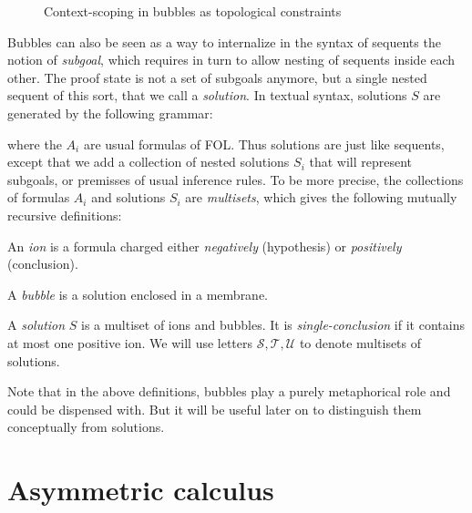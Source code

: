 \begin{figure}
  \caption{Context-scoping in bubbles as topological constraints}
\end{figure}

Bubbles can also be seen as a way to internalize in the syntax of sequents the
notion of \emph{subgoal}, which requires in turn to allow nesting of sequents
inside each other. The proof state is not a set of subgoals anymore, but a
single nested sequent of this sort, that we call a \emph{solution}. In textual syntax, solutions $S$ are generated by the
following grammar:
where the $A_i$ are usual formulas of FOL. Thus solutions are just like
sequents, except that we add a collection of nested solutions $S_i$ that will
represent subgoals, or premisses of usual inference rules. To be more precise,
the collections of formulas $A_i$ and solutions $S_i$ are \emph{multisets},
which gives the following mutually recursive definitions:
\begin{definition}[Ion]
  An \emph{ion} is a formula charged either \emph{negatively} (hypothesis) or
  \emph{positively} (conclusion).
\end{definition}
\begin{definition}[Bubble]
  A \emph{bubble} is a solution enclosed in a membrane.
\end{definition}
\begin{definition}[Solution]
  A \emph{solution} $S$ is a multiset of ions and bubbles. It is
  \emph{single-conclusion} if it contains at most one positive ion. We will use
  letters $\mathcal{S}, \mathcal{T}, \mathcal{U}$ to denote multisets of
  solutions.
\end{definition}
Note that in the above definitions, bubbles play a purely metaphorical role and
could be dispensed with. But it will be useful later on to distinguish them
conceptually from solutions.

\section{Asymmetric calculus}

